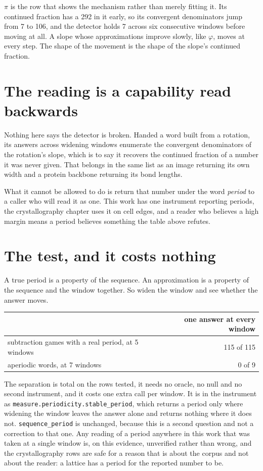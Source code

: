 \(\pi\) is the row that shows the mechanism rather than merely fitting it. Its continued fraction
has a 292 in it early, so its convergent denominators jump from 7 to 106, and the detector holds 7
across six consecutive windows before moving at all. A slope whose approximations improve slowly,
like \(\varphi\), moves at every step. The shape of the movement is the shape of the slope's
continued fraction.

\section{The reading is a capability read backwards}

Nothing here says the detector is broken. Handed a word built from a rotation, its answers across
widening windows enumerate the convergent denominators of the rotation's slope, which is to say it
recovers the continued fraction of a number it was never given. That belongs in the same list as an
image returning its own width and a protein backbone returning its bond lengths.

What it cannot be allowed to do is return that number under the word \emph{period} to a caller who
will read it as one. This work has one instrument reporting periods, the crystallography chapter
uses it on cell edges, and a reader who believes a high margin means a period believes something the
table above refutes.

\section{The test, and it costs nothing}

A true period is a property of the sequence. An approximation is a property of the sequence and the
window together. So widen the window and see whether the answer moves.

\begin{center}
\begin{tabular}{@{}lr@{}}
\toprule
& one answer at every window \\
\midrule
subtraction games with a real period, at 5 windows & 115 of 115 \\
aperiodic words, at 7 windows & 0 of 9 \\
\bottomrule
\end{tabular}
\end{center}

The separation is total on the rows tested, it needs no oracle, no null and no second instrument,
and it costs one extra call per window. It is in the instrument as
\texttt{measure.\allowbreak{}periodicity.\allowbreak{}stable\_\allowbreak{}period}, which returns
a period only where widening the window leaves the answer alone and returns nothing where it does
not. \texttt{sequence\_period} is unchanged, because this is a second question and not a correction
to that one. Any reading of a period anywhere in this work that was taken
at a single window is, on this evidence, unverified rather than wrong, and the crystallography rows
are safe for a reason that is about the corpus and not about the reader: a lattice has a period for
the reported number to be.

